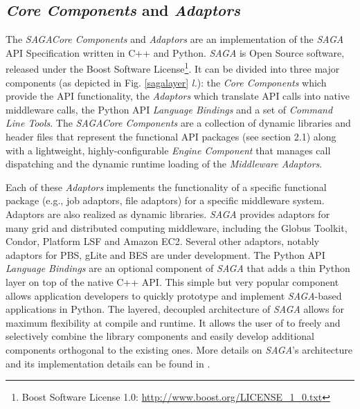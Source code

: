 \documentclass[a4paper,10pt]{article}
\newcommand{\I}[1]{\textit{#1}}
\newcommand{\BI}[1]{\textbf{\textit{#1}}}
\newcommand{\sagaspec}{\textit{SAGA}\xspace}
\newcommand{\sagaimpl}{\textit{SAGA}\xspace}
\newcommand{\spec}{\sagaspec}
\newcommand{\impl}{\sagaimpl}
\begin{document}
\subsection{\BI{Core Components} and \BI{Adaptors}}

The \impl \I{Core Components} and \I{Adaptors} are an implementation
of the \spec API Specification written in C++ and Python. \impl is
Open Source software, released under the Boost Software
License\footnote{Boost Software License 1.0:
  \url{http://www.boost.org/LICENSE_1_0.txt}}. It can be divided into
three major components (as depicted in Fig. \ref{sagalayer} \I{l.}):
the \I{Core Components} which provide the API functionality, the
\I{Adaptors} which translate API calls into native middleware calls,
the Python API \I{Language Bindings} and a set of \I{Command Line
  Tools}. The \impl \I{Core Components} are a collection of dynamic
libraries and header files that represent the functional API packages
(see section 2.1) along with a lightweight, highly-configurable
\I{Engine Component} that manages call dispatching and the dynamic
runtime loading of the \I{Middleware Adaptors}.


Each of these \I{Adaptors} implements the functionality of a specific
functional package (e.g., job adaptors, file adaptors) for a specific
middleware system. Adaptors are also realized as dynamic
libraries. \impl provides adaptors for many grid and distributed
computing middleware, including the Globus Toolkit, Condor, Platform
LSF and Amazon EC2. Several other adaptors, notably adaptors for PBS,
gLite and BES are under development. The Python API \I{Language
  Bindings} are an optional component of \impl that adds a thin Python
layer on top of the native C++ API. This simple but very popular
component allows application developers to quickly prototype and
implement \impl-based applications in Python.  The layered, decoupled
architecture of \impl allows for maximum flexibility at compile and
runtime. It allows the user of to freely and selectively combine the
library components and easily develop additional components orthogonal
to the existing ones. More details on \impl's architecture and its
implementation details can be found in \cite{OOPSLA_PAPER}.
\end{document}
